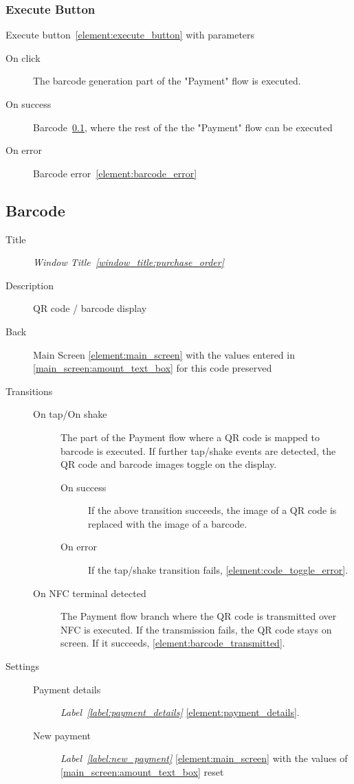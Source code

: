 \documentclass[a4paper,10pt]{article}
\newcommand{\windowTitleLabelText}{Window Title}
\newcommand{\windowTitleLabel}{window_title:}
\DeclareRobustCommand{\windowTitleRef}[1]{%
   \emph{\windowTitleLabelText~\ref{\windowTitleLabel#1}}}
\newcommand{\labelLabelText}{Label}
\newcommand{\labelLabel}{label:}
\DeclareRobustCommand{\labelRef}[1]{%
   \emph{\labelLabelText~\ref{\labelLabel#1}}}
\newcommand{\elementLabel}{element:}
\DeclareRobustCommand{\element}[2]{\subsection{#1}\label{\elementLabel#2}}
\DeclareRobustCommand{\elementRef}[1]{\ref{\elementLabel#1}}
\begin{document}
\subsubsection{Execute Button}
Execute button~\elementRef{execute_button} with parameters
\begin{description}
 \item[On click] The barcode generation part of the "Payment" flow is executed.
 \item[On success] Barcode~\elementRef{barcode}, where the rest of the the 
"Payment" flow can be executed
 \item[On error] Barcode error~\elementRef{barcode_error}
\end{description}

\element{Barcode}{barcode}

\begin{description}
 \item[Title] \windowTitleRef{purchase_order}
 \item[Description] QR code / barcode display
 \item[Back] Main Screen \elementRef{main_screen} with the values entered in 
\ref{main_screen:amount_text_box} for this code preserved
 \item[Transitions]\mbox{}
 \begin{description}
  \item[On tap/On shake] The part of the Payment flow where a QR code is mapped 
to barcode is executed. If further tap/shake events are detected, the QR code 
and barcode images toggle on the display.
  \begin{description}
   \item[On success] If the above transition succeeds, the image of a QR code 
is replaced with the image of a barcode.
   \item[On error] If the tap/shake transition fails, 
\elementRef{code_toggle_error}.
  \end{description}
  \item[On NFC terminal detected] The Payment flow branch where the QR code is 
transmitted over NFC is executed. If the transmission fails, the QR code stays 
on screen. If it succeeds, \elementRef{barcode_transmitted}.
 \end{description}
 \item[Settings]\mbox{}
 \begin{description}
  \item[Payment details] \labelRef{payment_details} 
\elementRef{payment_details}.
  \item[New payment] \labelRef{new_payment} \elementRef{main_screen} with the 
values of \ref{main_screen:amount_text_box} reset
 \end{description}
\end{description}
\end{document}
